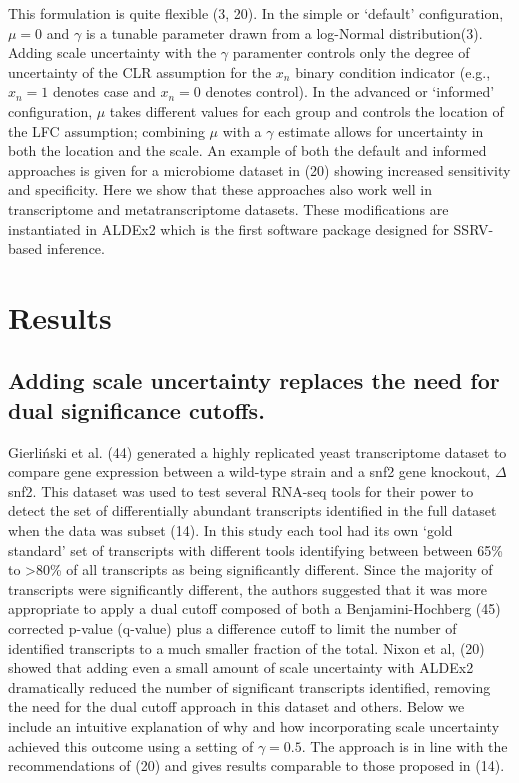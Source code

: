 \documentclass[
]{article}
\begin{document}
This formulation is quite flexible (3, 20). In the simple or `default'
configuration, \(\mu = 0\) and \(\gamma\) is a tunable parameter drawn
from a log-Normal distribution(3). Adding scale uncertainty with the
\(\gamma\) paramenter controls only the degree of uncertainty of the CLR
assumption for the \(x_{n}\) binary condition indicator (e.g.,
\(x_{n}=1\) denotes case and \(x_{n}=0\) denotes control). In the
advanced or `informed' configuration, \(\mu\) takes different values for
each group and controls the location of the LFC assumption; combining
\(\mu\) with a \(\gamma\) estimate allows for uncertainty in both the
location and the scale. An example of both the default and informed
approaches is given for a microbiome dataset in (20) showing increased
sensitivity and specificity. Here we show that these approaches also
work well in transcriptome and metatranscriptome datasets. These
modifications are instantiated in ALDEx2 which is the first software
package designed for SSRV-based inference.

\section{Results}\label{results}

\subsection{Adding scale uncertainty replaces the need for dual
significance
cutoffs.}\label{adding-scale-uncertainty-replaces-the-need-for-dual-significance-cutoffs.}

Gierliński et al. (44) generated a highly replicated yeast transcriptome
dataset to compare gene expression between a wild-type strain and a snf2
gene knockout, \(\Delta\)snf2. This dataset was used to test several
RNA-seq tools for their power to detect the set of differentially
abundant transcripts identified in the full dataset when the data was
subset (14). In this study each tool had its own `gold standard' set of
transcripts with different tools identifying between between 65\% to
\textgreater80\% of all transcripts as being significantly different.
Since the majority of transcripts were significantly different, the
authors suggested that it was more appropriate to apply a dual cutoff
composed of both a Benjamini-Hochberg (45) corrected p-value (q-value)
plus a difference cutoff to limit the number of identified transcripts
to a much smaller fraction of the total. Nixon et al, (20) showed that
adding even a small amount of scale uncertainty with ALDEx2 dramatically
reduced the number of significant transcripts identified, removing the
need for the dual cutoff approach in this dataset and others. Below we
include an intuitive explanation of why and how incorporating scale
uncertainty achieved this outcome using a setting of \(\gamma=0.5\). The
approach is in line with the recommendations of (20) and gives results
comparable to those proposed in (14).
\end{document}
